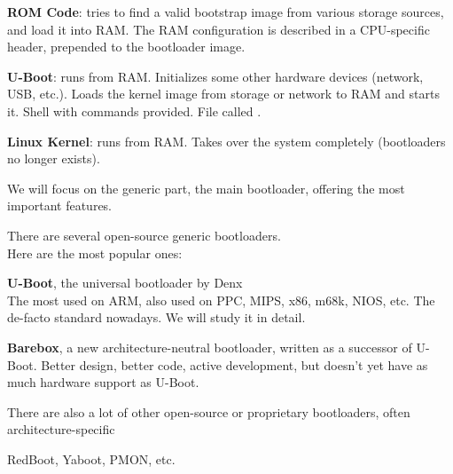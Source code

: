     \startitemize
    \item {\bf ROM Code}: tries to find a valid bootstrap image from
      various storage sources, and load it into RAM. The RAM
      configuration is described in a CPU-specific header, prepended
      to the bootloader image.
    \item {\bf U-Boot}: runs from RAM. Initializes some other hardware
      devices (network, USB, etc.).  Loads the kernel image from
      storage or network to RAM and starts it. Shell with commands
      provided. File called .
    \item {\bf Linux Kernel}: runs from RAM. Takes over the system
      completely (bootloaders no longer exists).
    \stopitemize

  \startitemize
  \item We will focus on the generic part, the main bootloader, offering
    the most important features.
  \item There are several open-source generic bootloaders.\\
    Here are the most popular ones:
    \startitemize
    \item {\bf U-Boot}, the universal bootloader by Denx\\
      The most used on ARM, also used on PPC, MIPS, x86, m68k, NIOS,
      etc. The de-facto standard nowadays. We will study it in detail.\\
    \item {\bf Barebox}, a new architecture-neutral bootloader, written
      as a successor of U-Boot. Better design, better code, active
      development, but doesn't yet have as much hardware support as U-Boot.\\
    \stopitemize
  \item There are also a lot of other open-source or proprietary
    bootloaders, often architecture-specific
    \startitemize
    \item RedBoot, Yaboot, PMON, etc.
    \stopitemize
  \stopitemize
